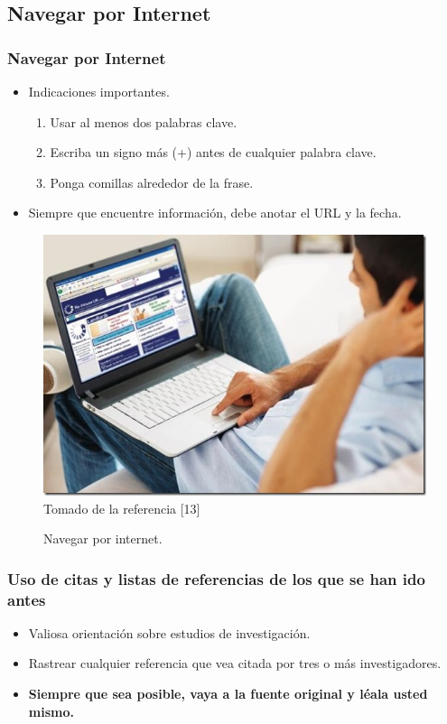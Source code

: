 \documentclass{beamer}
\begin{document}
    \subsection{Navegar por Internet}
    \begin{frame}\frametitle{Navegar por Internet}
    \begin{multicols}{2}  
        \begin{itemize}
            \item Indicaciones importantes. 
                \begin{enumerate}
                    \item Usar al menos dos palabras clave.
                    \item Escriba un signo m\'as (+) antes de cualquier palabra clave.
                    \item Ponga comillas alrededor de la frase.
                \end{enumerate} 
            \item Siempre que encuentre informaci\'on, debe anotar el URL y la fecha.
        \end{itemize} 
        \begin{figure}
                \includegraphics[scale=0.25]{figures/navWeb}
                \newline
                {\tiny Tomado de la referencia [13] }
                \caption{Navegar por internet. }
            \end{figure}
        \end{multicols}
    \end{frame}

   \begin{frame}
   \frametitle{Uso de citas y listas de referencias de los que se han ido antes}
        \begin{itemize}
            \item Valiosa orientaci\'on sobre estudios de investigaci\'on.  
            \item Rastrear cualquier referencia que vea citada por tres o m\'as investigadores.
            \item \textbf{Siempre que sea posible, vaya a la fuente original y l\'eala usted mismo.}
        \end{itemize} 
    \end{frame}
\end{document}
